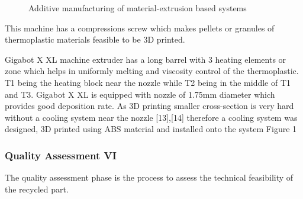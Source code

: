 \documentclass[
  11pt,
]{article}
\begin{document}
\begin{figure}

\begin{minipage}[t]{0.50\linewidth}

{\centering 


}

\end{minipage}%

\caption{\label{fig-smart-collector}Additive manufacturing of
material-extrusion based systems}

\end{figure}

This machine has a compressions screw which makes pellets or granules of
thermoplastic materials feasible to be 3D printed.

Gigabot X XL machine extruder has a long barrel with 3 heating elements
or zone which helps in uniformly melting and viscosity control of the
thermoplastic. T1 being the heating block near the nozzle while T2 being
in the middle of T1 and T3. Gigabot X XL is equipped with nozzle of
1.75mm diameter which provides good deposition rate. As 3D printing
smaller cross-section is very hard without a cooling system near the
nozzle {[}13{]},{[}14{]} therefore a cooling system was designed, 3D
printed using ABS material and installed onto the system Figure 1

\hypertarget{quality-assessment-vi}{%
\subsubsection{Quality Assessment VI}\label{quality-assessment-vi}}

The quality assessment phase is the process to assess the technical
feasibility of the recycled part.
\end{document}
